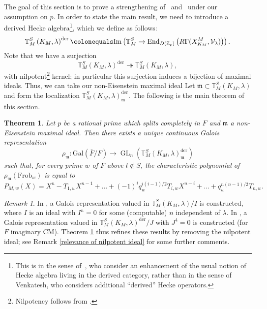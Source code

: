 \documentclass{amsart}
\newtheorem{thm}[subsubsection]{Theorem}
\theoremstyle{remark}
\newtheorem{rem}[subsubsection]{Remark}
\numberwithin{equation}{subsection}
\newcommand{\Z}{\ZZ}
\newcommand{\m}{\frakm}
\newcommand{\ZZ}{{\mathbb Z}}
\newcommand{\frakm}{\mathfrak{m}}
\DeclareMathOperator{\GL}{GL}
\newcommand{\Frob}{\mathrm{Frob}}
\newcommand{\mf}{\mathfrak}
\newcommand{\defeq}{\colonequals}
\renewcommand{\(}{\left(}
\renewcommand{\)}{\right)}
\begin{document}
The goal of this section is to prove a 
strengthening of~\cite[Thm.~5.4.4]{scholze-galois} and~\cite[Thm.~1.3]{newton-thorne} under our assumption on $p$. 
In order to state the main result, we need to introduce a derived Hecke algebra\footnote{This is in the sense of~\cite{newton-thorne}, who consider an enhancement of the
usual notion of Hecke algebra living in the derived category, rather than in the sense of 
Venkatesh, who considers additional ``derived'' Hecke operators.}, which we define as follows: 
\[
\mathbb{T}^S_{M}\left(K_M, \lambda\right)^{\mathrm{der}}\defeq \mathrm{Im}\left(\mathbb{T}^S_{M}\to \mathrm{End}_{D(\Z_p)}\left(R\Gamma(X^M_{K_M},\mathcal{V}_{\lambda})\right)\right).
\]
Note that we have a surjection 
\[
\mathbb{T}^S_{M}\left(K_M,\lambda\right)^{\mathrm{der}}\twoheadrightarrow \mathbb{T}^S_{M}\left(K_M,\lambda\right),
\]
with nilpotent\footnote{Nilpotency follows from \cite[Lemma 2.5]{khare-thorne}.} kernel; in particular this surjection induces a bijection of maximal ideals. Thus, we can take our non-Eisenstein maximal ideal Let $\m\subset \mathbb{T}^S_{M}\left(K_M,\lambda\right)$ and form the localization $\mathbb{T}^S_{M}\left(K_M,\lambda\right)^{\mathrm{der}}_\mf{m}$. The following is the main theorem of this section.

\begin{thm}\label{eliminating nilpotent ideal} Let $p$ be a rational prime which splits completely in $F$ and $\m$ a non-Eisenstein maximal ideal. 
Then there exists a unique continuous Galois 
representation 
\[
\rho_{\m}\colon \mathrm{Gal}(\overline{F}/F)\to \GL_n\left(\mathbb{T}^S_{M}\left(K_M,\lambda\right)^{\mathrm{der}}_{\m}\right)
\]
such that, for every prime $w$ of $F$ above $l\not\in S$, the characteristic polynomial of $\rho_{\m}(\Frob_w)$ is equal to 
\[
P_{M,w}(X) = X^{n} - T_{1,w}X^{n-1}+\dots + (-1)^iq_{w}^{i(i-1)/2}T_{i,w}X^{n-i} +\dots + q_{w}^{n(n-1)/2}T_{n,w}.
\]
\end{thm}

\begin{rem}
In \cite[Thm.~5.4.4]{scholze-galois}, a Galois representation valued in $\mathbb{T}^S_{M}\left(K_M,\lambda\right)/I$ is constructed, where $I$ is an ideal with $I^n =0$ for some (computable) $n$ independent of $\lambda$. In \cite[Thm.~1.3]{newton-thorne}, a Galois representation valued in $\mathbb{T}^S_{M}\left(K_M,\lambda\right)^\mathrm{der}/J$ with $J^4 =0$ is constructed (for $F$ imaginary CM). Theorem \ref{eliminating nilpotent ideal} thus refines these results by removing the nilpotent ideal; see Remark \ref{relevance of nilpotent ideal} for some further comments.
\end{rem}
\end{document}
